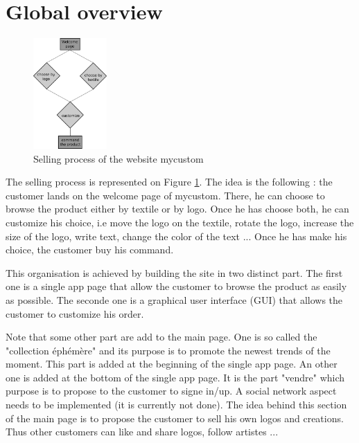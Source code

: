 \section{Global overview}

\begin{figure}[!ht]
	\centering
	\includegraphics[width=0.25\textwidth]{overview/sellingProcess}
	\caption{Selling process of the website mycustom}
	\label{fig:sellingProcess}
\end{figure}

The selling process is represented on Figure \ref{fig:sellingProcess}. The idea is the following : the customer lands on the welcome page of mycustom. There, he can choose to browse the product either by textile or by logo. Once he has choose both, he can customize his choice, i.e move the logo on the textile, rotate the logo, increase the size of the logo, write text, change the color of the text ... Once he has make his choice, the customer buy his command.

This organisation is achieved by building the site in two distinct part. The first one is a single app page that allow the customer to browse the product as easily as possible. The seconde one is a graphical user interface (GUI) that allows the customer to customize his order. 

Note that some other part are add to the main page. One is so called the "collection éphémère" and its purpose is to promote the newest trends of the moment. This part is added at the beginning of the single app page. An other one is added at the bottom of the single app page. It is the part "vendre" which purpose is to propose to the customer to signe in/up. A social network aspect needs to be implemented (it is currently not done). The idea behind this section of the main page is to propose the customer to sell his own logos and creations. Thus other customers can like and share logos, follow artistes ... 
